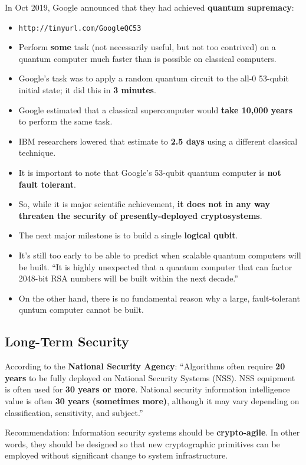 \documentclass[12pt,titlepage]{article}
\begin{document}
In Oct 2019, Google announced that they had achieved \textbf{quantum supremacy}: \begin{itemize}
	\item \texttt{http://tinyurl.com/GoogleQC53}
	\item Perform \textbf{some} task (not necessarily useful, but not too contrived) on a quantum computer much faster than is possible on classical computers.
	\item Google’s task was to apply a random quantum circuit to the all-0 53-qubit initial state; it did this in \textbf{3 minutes}.
	\item Google estimated that a classical supercomputer would \textbf{take 10,000 years} to perform the same task.
	\item IBM researchers lowered that estimate to \textbf{2.5 days} using a different classical technique.
\end{itemize}

\begin{itemize}
	\item It is important to note that Google’s 53-qubit quantum computer is \textbf{not fault tolerant}.
	\item So, while it is major scientific achievement, \textbf{it does not in any way threaten the security of presently-deployed cryptosystems}.
	\item The next major milestone is to build a single \textbf{logical qubit}.
	\item It’s still too early to be able to predict when scalable quantum computers will be built. ``It is highly unexpected that a quantum computer that can factor 2048-bit RSA numbers will be built within the next decade.''
	\item On the other hand, there is no fundamental reason why a large, fault-tolerant quntum computer cannot be built.
\end{itemize}
\subsection{Long-Term Security}
According to the \textbf{National Security Agency}: ``Algorithms often require \textbf{20 years} to be fully deployed on National Security Systems (NSS). NSS equipment is often used for \textbf{30 years or more}. National security information intelligence value is often \textbf{30 years (sometimes more)}, although it may vary depending on classification, sensitivity, and subject.''

Recommendation: Information security systems should be \textbf{crypto-agile}. In other words, they should be designed so that new cryptographic primitives can be employed without significant change to system infrastructure.
\end{document}
